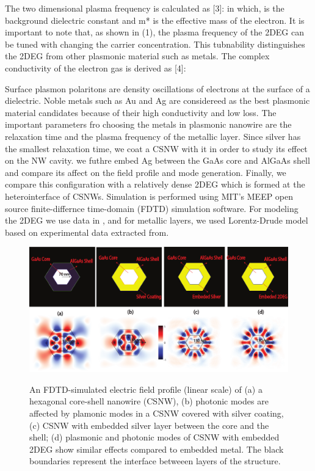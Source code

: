 The two dimensional plasma frequency is calculated as [3]: in which,  is the
background dielectric constant and m* is the effective mass of the electron. It
is important to note that, as shown in (1), the plasma frequency of the 2DEG
can be tuned with changing the carrier concentration. This tubnability
distinguishes the 2DEG from other plasmonic material such as metals. The
complex conductivity of the electron gas is derived as [4]:

Surface plasmon polaritons are density oscillations of electrons at the surface
of a dielectric. Noble metals such as Au and Ag are considereed as the best
plasmonic material candidates because of their high conductivity and low loss.
The important parameters fro choosing the metals in plasmonic nanowire are the
relaxation time and the plasma frequency of the metallic layer. Since silver
has the smallest relaxation time, we coat a CSNW with it in order to study its
effect on the NW cavity. we futhre embed Ag between the GaAs core and AlGaAs
shell and compare its affect on the field profile and mode generation. Finally,
we compare this configuration with a relatively dense 2DEG which is formed at
the heterointerface of CSNWs. Simulation is performed using MIT's MEEP open
source finite-differnce time-domain (FDTD) simulation software.  For modeling
the 2DEG we use data in , and for metallic layers, we used Lorentz-Drude model
based on experimental data extracted from.

\begin{figure}
  \caption{An FDTD-simulated electric field profile (linear scale) of (a) a hexagonal core-shell nanowire (CSNW), (b) photonic modes are affected by plamonic modes in a CSNW covered with silver coating, (c) CSNW with embedded silver layer between the core and the shell; (d) plasmonic and photonic modes of CSNW with embedded 2DEG show similar effects compared to embedded metal. The black boundaries represent the interface betweeen layers of the structure.}
  \centering
  \includegraphics[width=\textwidth]{pictures/Conclusion/PlasmonMode}
  \label{PlasmonMode}
\end{figure}

